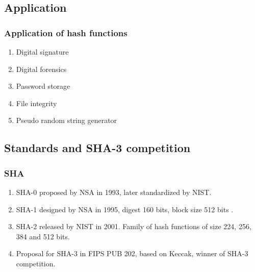 \documentclass{beamer}
\begin{document}

\subsection{Application}
\begin{frame}
\frametitle{Application of hash functions}
\begin{enumerate}
\item Digital signature
\item Digital forensics \footnotemark
\item Password storage
\item File integrity
\item Pseudo random string generator
\end{enumerate}
\end{frame}

\subsection{Standards and SHA-3 competition}

\begin{frame}
  \frametitle{SHA}
  \begin{enumerate}
    \item SHA-0 proposed by NSA in 1993, later standardized by NIST.
    \item SHA-1 designed by NSA in 1995, digest 160 bits, block size 512 bits \footnotemark.
    \item SHA-2 released by NIST in 2001. Family of hash functions of size 224, 256, 384 and 512 bits.
    \item Proposal for SHA-3 in FIPS PUB 202, based on Keccak, winner of SHA-3 competition.
  \end{enumerate}
\end{frame}
\end{document}
